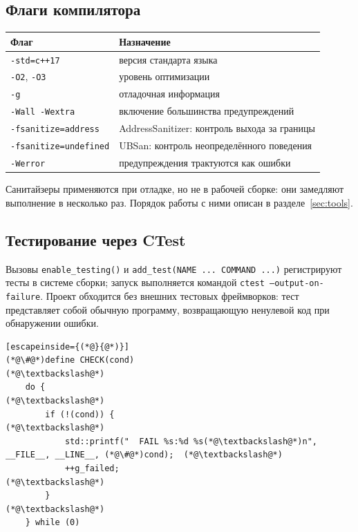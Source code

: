 \documentclass[11pt,a4paper]{article}
\theoremstyle{definition}
\theoremstyle{remark}
\begin{document}
\subsection{Флаги компилятора}

\begin{center}
\begin{tabular}{ll}
\toprule
Флаг & Назначение \\
\midrule
\texttt{-std=c++17} & версия стандарта языка \\
\texttt{-O2}, \texttt{-O3} & уровень оптимизации \\
\texttt{-g} & отладочная информация \\
\texttt{-Wall -Wextra} & включение большинства предупреждений \\
\texttt{-fsanitize=address} & AddressSanitizer: контроль выхода за границы \\
\texttt{-fsanitize=undefined} & UBSan: контроль неопределённого поведения \\
\texttt{-Werror} & предупреждения трактуются как ошибки \\
\bottomrule
\end{tabular}
\end{center}

Санитайзеры применяются при отладке, но не в рабочей сборке: они замедляют
выполнение в несколько раз. Порядок работы с ними описан в
разделе~\ref{sec:tools}.

\subsection{Тестирование через CTest}

Вызовы \texttt{enable\_testing()} и \texttt{add\_test(NAME ... COMMAND ...)}
регистрируют тесты в системе сборки; запуск выполняется командой
\texttt{ctest --output-on-failure}. Проект обходится без внешних тестовых
фреймворков: тест представляет собой обычную программу, возвращающую
ненулевой код при обнаружении ошибки.

\begin{lstlisting}[escapeinside={(*@}{@*)}]
(*@\#@*)define CHECK(cond)                                                       (*@\textbackslash@*)
    do {                                                                  (*@\textbackslash@*)
        if (!(cond)) {                                                    (*@\textbackslash@*)
            std::printf("  FAIL %s:%d %s(*@\textbackslash@*)n", __FILE__, __LINE__, (*@\#@*)cond);  (*@\textbackslash@*)
            ++g_failed;                                                   (*@\textbackslash@*)
        }                                                                 (*@\textbackslash@*)
    } while (0)
\end{lstlisting}
\end{document}
